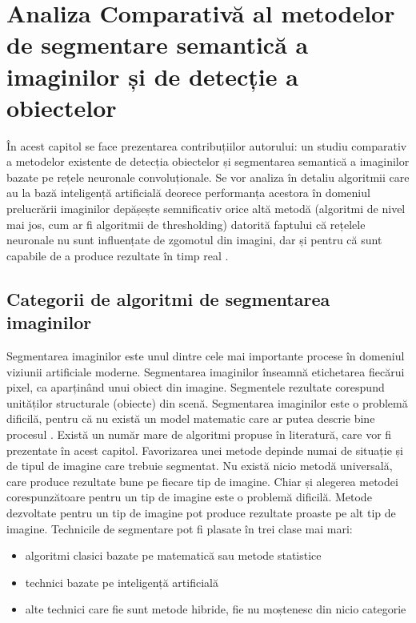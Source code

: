 \chapter{Analiza Comparativă al metodelor de segmentare semantică a imaginilor și de detecție a obiectelor}
\label{cap:contributii}
În acest capitol se face prezentarea contribuțiilor autorului: un studiu comparativ a metodelor existente de detecția obiectelor și segmentarea semantică a imaginilor bazate pe rețele neuronale convoluționale.\newline
Se vor analiza în detaliu algoritmii care au la bază inteligență artificială deorece performanța acestora în domeniul prelucrării imaginilor depășește semnificativ orice altă metodă (algoritmi de nivel mai jos, cum ar fi algoritmii de thresholding) datorită faptului că rețelele neuronale nu sunt influențate de zgomotul din imagini, dar și pentru că sunt capabile de a produce rezultate în timp real \cite{cat_amz}.


\section{Categorii de algoritmi de segmentarea imaginilor}
Segmentarea imaginilor este unul dintre cele mai importante procese în domeniul viziunii artificiale moderne. Segmentarea imaginilor înseamnă etichetarea fiecărui pixel, ca aparținând unui obiect din imagine. Segmentele rezultate corespund unităților structurale (obiecte) din scenă. Segmentarea imaginilor este o problemă dificilă, pentru că nu există un model matematic care ar putea descrie bine procesul \cite{cat_amz}.\newline
Există un număr mare de algoritmi propuse în literatură, care vor fi prezentate în acest capitol. Favorizarea unei metode depinde numai de situație și de tipul de imagine care trebuie segmentat. Nu există nicio metodă universală, care produce rezultate bune pe fiecare tip de imagine. Chiar și alegerea metodei corespunzătoare pentru un tip de imagine este o problemă dificilă. Metode dezvoltate pentru un tip de imagine pot produce rezultate proaste pe alt tip de imagine.\newline
Technicile de segmentare pot fi plasate în trei clase mai mari:
\begin{itemize}
	\item algoritmi clasici bazate pe matematică sau metode statistice
	\item technici bazate pe inteligență artificială
	\item alte technici care fie sunt metode hibride, fie nu moștenesc din nicio categorie
\end{itemize}

